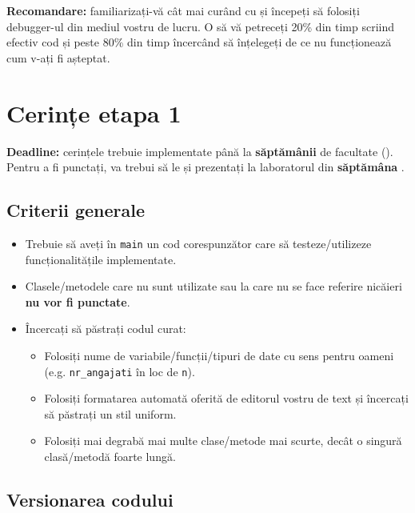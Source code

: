 \textbf{Recomandare:} familiarizați-vă cât mai curând cu și începeți să folosiți debugger-ul din mediul vostru de lucru. O să vă petreceți 20\% din timp scriind efectiv cod și peste 80\% din timp încercând să înțelegeți de ce nu funcționează cum v-ați fi așteptat.

\newpage

\section*{Cerințe etapa 1} \label{phase1}

\textbf{Deadline:} cerințele trebuie implementate până la \phaseonedeadlineweekperiod{} \textbf{săptămânii \phaseonedeadlineweek} de facultate (\textbf{\phaseonedeadlinedate}). Pentru a fi punctați, va trebui să le și prezentați la laboratorul din \textbf{săptămâna \phaseonepresentationweek}.

\subsection*{Criterii generale}

\begin{itemize}
    \item Trebuie să aveți în \texttt{main} un cod corespunzător care să testeze/utilizeze funcționalitățile implementate.
    
    \item Clasele/metodele care nu sunt utilizate sau la care nu se face referire nicăieri \textbf{nu vor fi punctate}.

    \item Încercați să păstrați codul curat:
    \begin{itemize}
        \item Folosiți nume de variabile/funcții/tipuri de date cu sens pentru oameni (e.g. \texttt{nr\_angajati} în loc de \texttt{n}).
        
        \item Folosiți formatarea automată oferită de editorul vostru de text și încercați să păstrați un stil uniform.
        
        \item Folosiți mai degrabă mai multe clase/metode mai scurte, decât o singură clasă/metodă foarte lungă.
    \end{itemize}
\end{itemize}

\subsection*{Versionarea codului}

